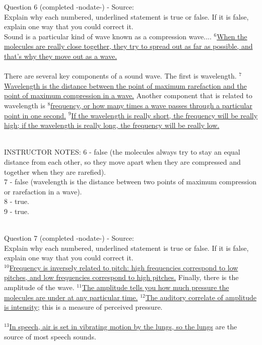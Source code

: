 \documentclass[12pt]{article}
\begin{document}
{\large Question 6} (completed -nodate-) - Source: \\

Explain why each numbered, underlined statement is true or false. If it is false, explain one way that you could correct it.\\

Sound is a particular kind of wave known as a compression wave.... $^6$\ul{When the molecules are really close together, they try to spread out as far as possible, and that’s why they move out as a wave.}\\\\There are several key components of a sound wave. The first is wavelength. $^7$\ul{Wavelength is the distance between the point of maximum rarefaction and the point of maximum compression in a wave.} Another component that is related to wavelength is $^8$\ul{frequency, or how many times a wave passes through a particular point in one second.} $^9$\ul{If the wavelength is really short, the frequency will be really high; if the wavelength is really long, the frequency will be really low.} 


~\\
INSTRUCTOR NOTES: 6 - false (the molecules always try to stay an equal distance from each other, so they move apart when they are compressed and together when they are rarefied).\\7 - false (wavelength is the distance between two points of maximum compression or rarefaction in a wave).\\8 - true.\\9 - true.


~\\

{\large Question 7} (completed -nodate-) - Source: \\

Explain why each numbered, underlined statement is true or false. If it is false, explain one way that you could correct it.\\

$^{10}$\ul{Frequency is inversely related to pitch: high frequencies correspond to low pitches, and low frequencies correspond to high pitches.} Finally, there is the amplitude of the wave. $^{11}$\ul{The amplitude tells you how much pressure the molecules are under at any particular time.} $^{12}$\ul{The auditory correlate of amplitude is intensity}; this is a measure of perceived pressure.\\\\$^{13}$\ul{In speech, air is set in vibrating motion by the lungs, so the lungs} are the source of most speech sounds.
\end{document}
